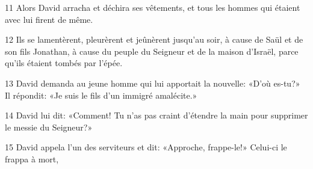
11 Alors David arracha et déchira ses vêtements, et tous les hommes qui étaient avec lui firent de même. 

12 Ils se lamentèrent, pleurèrent et jeûnèrent jusqu’au soir, à cause de Saül et de son fils Jonathan, à cause du peuple du Seigneur et de la maison d’Israël, parce qu’ils étaient tombés par l’épée.

13 David demanda au jeune homme qui lui apportait la nouvelle: «D’où es-tu?» Il répondit: «Je suis le fils d’un immigré amalécite.»

14 David lui dit: «Comment! Tu n’as pas craint d’étendre la main pour supprimer le messie du Seigneur?»

15 David appela l’un des serviteurs et dit: «Approche, frappe-le!» Celui-ci le frappa à mort,